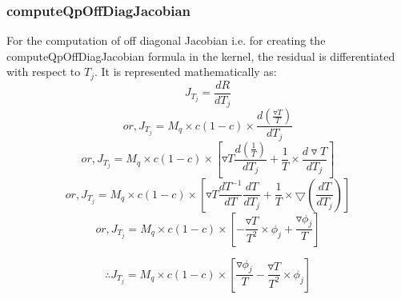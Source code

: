 \documentclass[12pt,a4paper]{article}
\begin{document}
\subsubsection{computeQpOffDiagJacobian}
For the computation of off diagonal Jacobian i.e. for creating the computeQpOffDiagJacobian formula in the kernel, the residual is differentiated with respect to $T_j$. It is represented mathematically as:
\begin{equation}
  J_{T_j} = \frac{dR}{dT_j}
  \end{equation}
  \begin{displaymath}
      or, J_{T_j} = M_q \times c(1-c) \times \frac{d (\frac{\triangledown T}{T})}{dT_j} 
 \end{displaymath}
  \begin{displaymath}
      or, J_{T_j} = M_q \times c(1-c) \times [\triangledown T \frac{d (\frac{1}{T})}{dT_j} + \frac{1}{T} \times \frac{d\triangledown T}{dT_j}]
 \end{displaymath}
 \begin{displaymath}
      or, J_{T_j} = M_q \times c(1-c) \times [\triangledown T \frac{dT^{-1}}{dT} \frac{dT}{dT_j} + \frac{1}{T} \times \bigtriangledown (\frac{dT}{dT_j})]
 \end{displaymath}
 \begin{displaymath}
 or, J_{T_j} = M_q \times c(1-c) \times [-\frac{\triangledown T}{T^2} \times \phi_j + \frac{\triangledown \phi_j}{T}]
 \end{displaymath}
 
 \begin{equation}
 \therefore J_{T_j} = M_q \times c(1-c) \times [\frac{\triangledown \phi_j}{T} - \frac{\triangledown T}{T^2} \times \phi_j]
 \end{equation}
 
  
\end{document}
